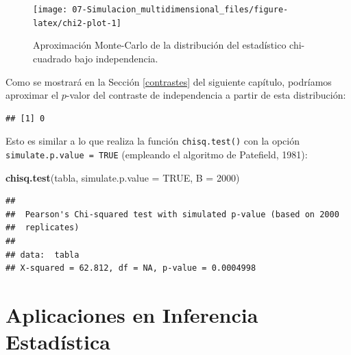\documentclass[
]{book}
\newenvironment{Shaded}{\begin{snugshade}}{\end{snugshade}}
\newcommand{\DataTypeTok}[1]{\textcolor[rgb]{0.13,0.29,0.53}{#1}}
\newcommand{\DecValTok}[1]{\textcolor[rgb]{0.00,0.00,0.81}{#1}}
\newcommand{\KeywordTok}[1]{\textcolor[rgb]{0.13,0.29,0.53}{\textbf{#1}}}
\newcommand{\NormalTok}[1]{#1}
\newcommand{\OperatorTok}[1]{\textcolor[rgb]{0.81,0.36,0.00}{\textbf{#1}}}
\newcommand{\OtherTok}[1]{\textcolor[rgb]{0.56,0.35,0.01}{#1}}
\newcommand{\StringTok}[1]{\textcolor[rgb]{0.31,0.60,0.02}{#1}}
\theoremstyle{break}
\theoremstyle{definition}
\theoremstyle{definition}
\theoremstyle{definition}
\theoremstyle{remark}
\begin{document}
\begin{figure}[!htb]

{\centering \texttt{[image: 07-Simulacion\_multidimensional\_files/figure-latex/chi2-plot-1]} 

}

\caption{Aproximación Monte-Carlo de la distribución del estadístico chi-cuadrado bajo independencia.}\label{fig:chi2-plot}
\end{figure}

Como se mostrará en la Sección \ref{contrastes} del siguiente capítulo, podríamos aproximar el \(p\)-valor del contraste de independencia a partir de esta distribución:

\begin{Shaded}
\end{Shaded}

\begin{verbatim}
## [1] 0
\end{verbatim}

Esto es similar a lo que realiza la función \texttt{chisq.test()} con la opción \texttt{simulate.p.value\ =\ TRUE} (empleando el algoritmo de Patefield, 1981):

\begin{Shaded}
\begin{Highlighting}[]
\KeywordTok{chisq.test}\NormalTok{(tabla, }\DataTypeTok{simulate.p.value =} \OtherTok{TRUE}\NormalTok{, }\DataTypeTok{B =} \DecValTok{2000}\NormalTok{)}
\end{Highlighting}
\end{Shaded}

\begin{verbatim}
## 
##  Pearson's Chi-squared test with simulated p-value (based on 2000
##  replicates)
## 
## data:  tabla
## X-squared = 62.812, df = NA, p-value = 0.0004998
\end{verbatim}

\hypertarget{cap8}{%
\chapter{Aplicaciones en Inferencia Estadística}\label{cap8}}
\end{document}
